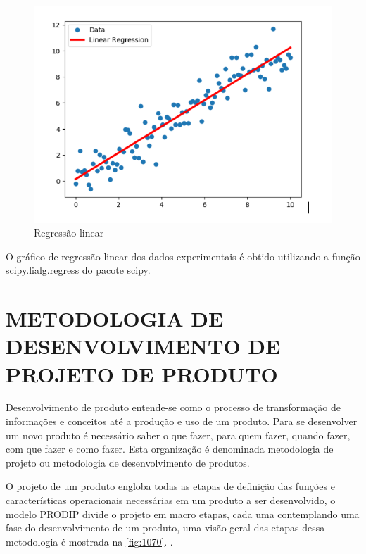 \begin{figure}[htb]
	\caption{\label{fig:1160} Regressão linear}
	\begin{center}
		\includegraphics[width=\textwidth]{pictures/1160.png}
	\end{center}
\end{figure}

O gráfico de regressão linear dos dados experimentais é obtido utilizando a função scipy.lialg.regress do pacote scipy.

\section{METODOLOGIA DE DESENVOLVIMENTO DE PROJETO DE PRODUTO}

Desenvolvimento de produto entende-se como o processo de transformação de informações e conceitos até a produção e uso de um produto. Para se desenvolver um novo produto
é necessário saber o que fazer, para quem fazer, quando fazer, com que fazer e como fazer. Esta organização é denominada metodologia de projeto ou metodologia de
desenvolvimento de produtos. \autocite{Back2008}

O projeto de um produto engloba todas as etapas de definição das funções e características operacionais necessárias em um produto a ser desenvolvido, o modelo PRODIP
divide o projeto em macro etapas, cada uma contemplando uma fase do desenvolvimento de um produto, uma visão geral das etapas dessa metodologia é mostrada na \autoref{fig:1070}.
\autocite{PRODIP}.

